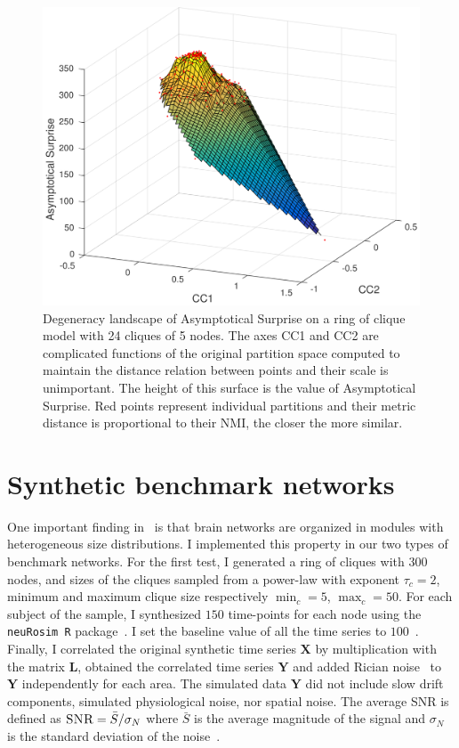 \begin{figure}[!htb]
\centering
\includegraphics[width=1.0\textwidth]{images/filtered_asymp_surp_ring_cliques_5_24_200.png}
\caption{Degeneracy landscape of Asymptotical Surprise on a ring of clique model with 24 cliques of 5 nodes. The axes CC1 and CC2 are complicated functions of the original partition space computed to maintain the distance relation between points and their scale is unimportant. The height of this surface is the value of Asymptotical Surprise. Red points represent individual partitions and their metric distance is proportional to their NMI, the closer the more similar.}
\label{fig:degeneracy_asymptotical_surprise}
\end{figure}


\section{Synthetic benchmark networks}
One important finding in~\cite{nicolini2016} is that brain networks are organized in modules with heterogeneous size distributions.
I implemented this property in our two types of benchmark networks.
For the first test, I generated a ring of cliques with $300$ nodes, and sizes of the cliques sampled from a power-law with exponent $\tau_c=2$, minimum and maximum clique size respectively $\min_c=5$, $\max_c=50$.
For each subject of the sample, I synthesized $150$ time-points for each node using the \texttt{neuRosim R} package~\cite{neurosim2011}.
I set the baseline value of all the time series to $100$~\cite{welvaert2013}. 
Finally, I correlated the original synthetic time series $\mathbf{X}$ by multiplication with the matrix $\mathbf{L}$, obtained the correlated time series $\mathbf{Y}$ and added Rician noise~\cite{Gudbjartsson1995} to $\mathbf{Y}$ independently for each area.
The simulated data $\mathbf{Y}$ did not include slow drift components, simulated physiological noise, nor spatial noise.
The average SNR is defined as $\textsc{SNR}=\bar{S}/\sigma_N$ where $\bar{S}$ is the average magnitude of the signal and $\sigma_N$ is the standard deviation of the noise~\cite{kruger2011}.

